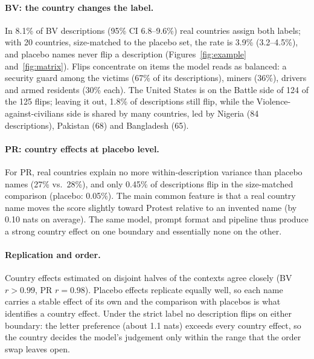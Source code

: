 \documentclass[11pt]{article}
\begin{document}
\paragraph{BV: the country changes the label.}
In 8.1\% of BV descriptions (95\% CI 6.8--9.6\%) real countries assign both labels; with 20 countries, size-matched to the placebo set, the rate is 3.9\% (3.2--4.5\%), and placebo names never flip a description (Figures~\ref{fig:example} and~\ref{fig:matrix}). Flips concentrate on items the model reads as balanced: a security guard among the victims (67\% of its descriptions), miners (36\%), drivers and armed residents (30\% each). The United States is on the Battle side of 124 of the 125 flips; leaving it out, 1.8\% of descriptions still flip, while the Violence-against-civilians side is shared by many countries, led by Nigeria (84 descriptions), Pakistan (68) and Bangladesh (65).

\paragraph{PR: country effects at placebo level.}
For PR, real countries explain no more within-description variance than placebo names (27\% vs.\ 28\%), and only 0.45\% of descriptions flip in the size-matched comparison (placebo: 0.05\%). The main common feature is that a real country name moves the score slightly toward Protest relative to an invented name (by 0.10 nats on average). The same model, prompt format and pipeline thus produce a strong country effect on one boundary and essentially none on the other.

\paragraph{Replication and order.}
Country effects estimated on disjoint halves of the contexts agree closely (BV $r>0.99$, PR $r=0.98$). Placebo effects replicate equally well, so each name carries a stable effect of its own and the comparison with placebos is what identifies a country effect. Under the strict label no description flips on either boundary: the letter preference (about 1.1 nats) exceeds every country effect, so the country decides the model's judgement only within the range that the order swap leaves open.
\end{document}
